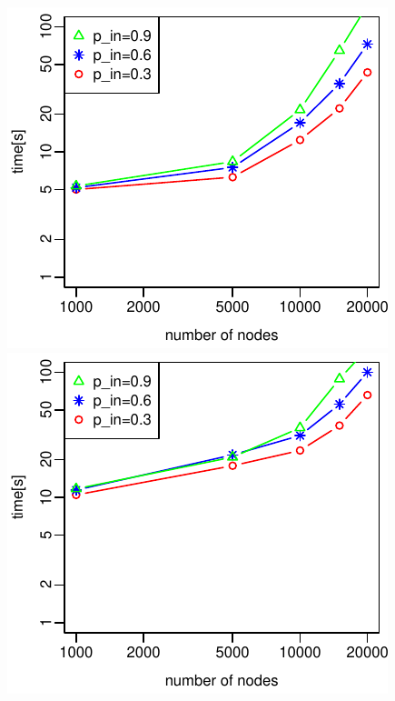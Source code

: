 \documentclass{article}
\begin{document}
\includegraphics{test_series_p_in_const_hashmap.pdf}
\includegraphics{test_series_p_in_const_treemap.pdf}
\end{document}
